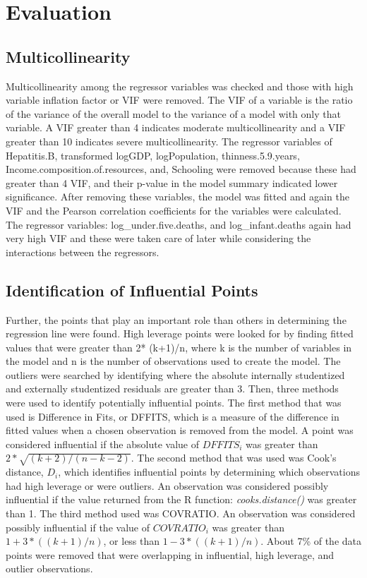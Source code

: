 \section{Evaluation}
\label{sec:evaluation}

\subsection{Multicollinearity}
\label{sec:multicollinearity}
Multicollinearity among the regressor variables was checked and those with high variable inflation factor or VIF were removed. The VIF of a variable is the ratio of the variance of the overall model to the variance of a model with only that variable. A VIF greater than 4 indicates moderate multicollinearity and a VIF greater than 10 indicates severe multicollinearity. The regressor variables of Hepatitis.B, transformed logGDP, logPopulation, thinness.5.9.years, Income.composition.of.resources, and, Schooling were removed because these had greater than 4 VIF, and their p-value in the model summary indicated lower significance. 
After removing these variables, the model was fitted and again the VIF and the Pearson correlation coefficients for the variables were calculated. The regressor variables: log\_under.five.deaths, and log\_infant.deaths again had very high VIF and these were taken care of later while considering the interactions between the regressors.

\subsection{Identification of Influential Points}
\label{sec:influential-points}
Further, the points that play an important role than others in determining the regression line were found. High leverage points were looked for by finding fitted values that were greater than 2* (k+1)/n, where k is the number of variables in the model and n is the number of observations used to create the model. The outliers were searched by identifying where the absolute internally studentized and externally studentized residuals are greater than 3. Then, three methods were used to identify potentially influential points. The first method that was used is Difference in Fits, or DFFITS, which is a measure of the difference in fitted values when a chosen observation is removed from the model. A point was considered influential if the absolute value of $DFFITS_i$ was greater than $2* \sqrt{(k+2)/(n-k-2)}$. The second method that was used was Cook’s distance, $D_i$, which identifies influential points by determining which observations had high leverage or were outliers. An observation was considered possibly influential if the value returned from the R function: \textit{cooks.distance()} was greater than 1. The third method used was COVRATIO. An observation was considered possibly influential if the value of $COVRATIO_i$ was greater than $1+ 3*((k+1)/n)$, or less than $1- 3*((k+1)/n)$.
About 7\% of the data points were removed that were overlapping in influential, high leverage, and outlier observations.

